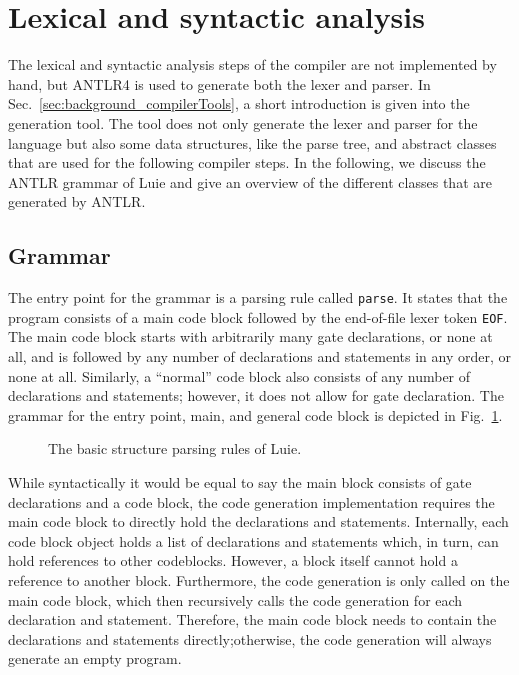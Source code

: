 \section{Lexical and syntactic analysis}
\label{sec:implementation_syntaxAnalysis}
The lexical and syntactic analysis steps of the compiler are not implemented by hand, but ANTLR4 is used to generate both the lexer and parser. In Sec.~\ref{sec:background_compilerTools}, a short introduction is given into the generation tool. The tool does not only generate the lexer and parser for the language but also some data structures, like the parse tree, and abstract classes that are used for the following compiler steps. In the following, we discuss the ANTLR grammar of Luie and give an overview of the different classes that are generated by ANTLR.

\subsection{Grammar}
\label{sec:implementation_grammar}
The entry point for the grammar is a parsing rule called \texttt{parse}. It states that the program consists of a main code block followed by the end-of-file lexer token \texttt{EOF}. The main code block starts with arbitrarily many gate declarations, or none at all, and is followed by any number of declarations and statements in any order, or none at all. Similarly, a ``normal'' code block also consists of any number of declarations and statements; however, it does not allow for gate declaration. The grammar for the entry point, main, and general code block is depicted in Fig.~\ref{fig:implementation_grammarStructure}.

\begin{figure}[htp]
    \centering
    
    \caption{The basic structure parsing rules of Luie.}
    \label{fig:implementation_grammarStructure}
\end{figure}

While syntactically it would be equal to say the main block consists of gate declarations and a code block, the code generation implementation requires the main code block to directly hold the declarations and statements. Internally, each code block object holds a list of declarations and statements which, in turn, can hold references to other codeblocks. However, a block itself cannot hold a reference to another block. Furthermore, the code generation is only called on the main code block, which then recursively calls the code generation for each declaration and statement. Therefore, the main code block needs to contain the declarations and statements directly;otherwise, the code generation will always generate an empty program. 

